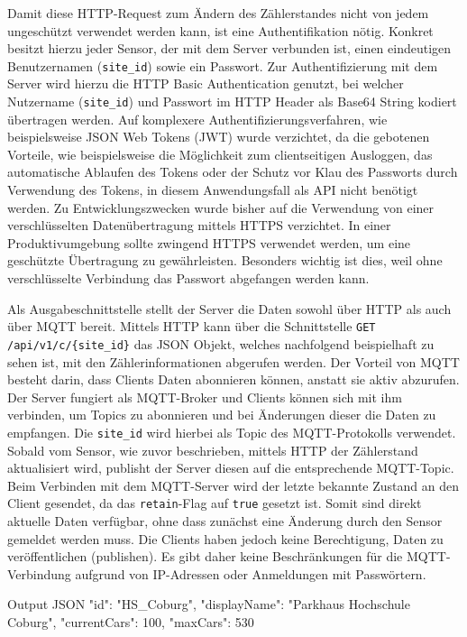 Damit diese HTTP-Request zum Ändern des Zählerstandes nicht von jedem ungeschützt verwendet werden kann, ist eine Authentifikation nötig.
Konkret besitzt hierzu jeder Sensor, der mit dem Server verbunden ist, einen eindeutigen Benutzernamen (\lstinline|site_id|) sowie ein Passwort.
Zur Authentifizierung mit dem Server wird hierzu die HTTP Basic Authentication genutzt, bei welcher Nutzername (\lstinline|site_id|) und Passwort im HTTP Header als Base64 String kodiert übertragen werden.
Auf komplexere Authentifizierungsverfahren, wie beispielsweise JSON Web Tokens (JWT) wurde verzichtet, da die gebotenen Vorteile, wie beispielsweise die Möglichkeit zum clientseitigen Ausloggen, das automatische Ablaufen des Tokens oder der Schutz vor Klau des Passworts durch Verwendung des Tokens, in diesem Anwendungsfall als API nicht benötigt werden.
Zu Entwicklungszwecken wurde bisher auf die Verwendung von einer verschlüsselten Datenübertragung mittels HTTPS verzichtet.
In einer Produktivumgebung sollte zwingend \mbox{HTTPS} verwendet werden, um eine geschützte Übertragung zu gewährleisten.
Besonders wichtig ist dies, weil ohne verschlüsselte Verbindung das Passwort abgefangen werden kann.

Als Ausgabeschnittstelle stellt der Server die Daten sowohl über HTTP als auch über MQTT bereit.
Mittels HTTP kann über die Schnittstelle \lstinline|GET /api/v1/c/{site_id}| das JSON Objekt, welches nachfolgend beispielhaft zu sehen ist, mit den Zählerinformationen abgerufen werden.
Der Vorteil von MQTT besteht darin, dass Clients Daten abonnieren können, anstatt sie aktiv abzurufen.
Der Server fungiert als MQTT-Broker und Clients können sich mit ihm verbinden, um Topics zu abonnieren und bei Änderungen dieser die Daten zu empfangen.
Die \lstinline|site_id| wird hierbei als Topic des MQTT-Protokolls verwendet.
Sobald vom Sensor, wie zuvor beschrieben, mittels HTTP der Zählerstand aktualisiert wird, publisht der Server diesen auf die entsprechende MQTT-Topic.
Beim Verbinden mit dem MQTT-Server wird der letzte bekannte Zustand an den Client gesendet, da das \lstinline|retain|-Flag auf \lstinline|true| gesetzt ist.
Somit sind direkt aktuelle Daten verfügbar, ohne dass zunächst eine Änderung durch den Sensor gemeldet werden muss.
Die Clients haben jedoch keine Berechtigung, Daten zu veröffentlichen (publishen).
Es gibt daher keine Beschränkungen für die MQTT-Verbindung aufgrund von IP-Adressen oder Anmeldungen mit Passwörtern.

\lstset{language=json, numbers=none}
\begin{center}
    \begin{mylisting}{Output JSON}
{
    "id": "HS_Coburg",
    "displayName": "Parkhaus Hochschule Coburg",
    "currentCars": 100,
    "maxCars": 530
}
    \end{mylisting}
\end{center}

